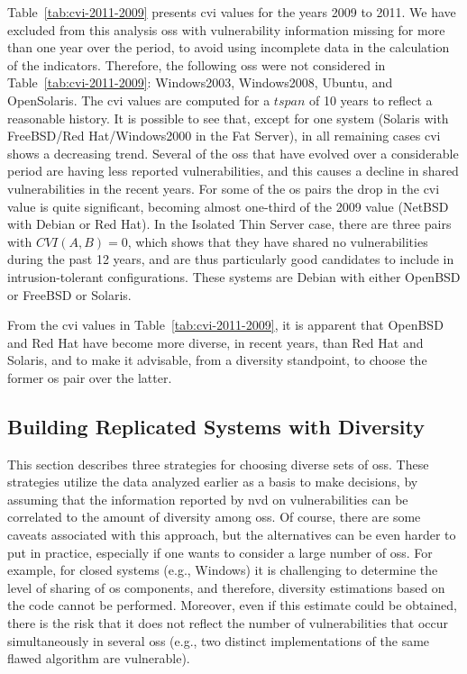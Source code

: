 Table~\ref{tab:cvi-2011-2009} presents \gls{cvi} values for the years 2009 to 2011. 
We have excluded from this analysis \glspl{os} with vulnerability information missing for more than one year over the period, to avoid using incomplete data in the calculation of the indicators. Therefore, the following \glspl{os} were not considered in Table~\ref{tab:cvi-2011-2009}: Windows2003, Windows2008, Ubuntu, and OpenSolaris. 
The \gls{cvi} values are computed for a $\mathit{tspan}$ of 10 years to reflect a reasonable history. 
It is possible to see that, except for one system (Solaris with FreeBSD/Red Hat/Windows2000 in the Fat Server), in all remaining cases \gls{cvi} shows a decreasing trend. 
Several of the \glspl{os} that have evolved over a considerable period are having less reported vulnerabilities, and this causes a decline in shared vulnerabilities in the recent years. 
For some of the \gls{os} pairs the drop in the \gls{cvi} value is quite significant, becoming almost one-third of the 2009 value (NetBSD with Debian or Red Hat). 
In the Isolated Thin Server case, there are three pairs with $\mathit{CVI}(A,B)=0$, which shows that they have shared no vulnerabilities during the past 12 years, and are thus particularly good candidates to include in intrusion-tolerant configurations. 
These systems are Debian with either OpenBSD or FreeBSD or Solaris.

From the \gls{cvi} values in Table~\ref{tab:cvi-2011-2009}, it is apparent that OpenBSD and Red Hat have become more diverse, in recent years, than Red Hat and Solaris, and to make it advisable, from a diversity standpoint, to choose the former \gls{os} pair over the latter.



\subsection{Building Replicated Systems with Diversity}
\label{build_diversity}


This section describes three strategies for choosing diverse sets of \glspl{os}. 
These strategies utilize the data analyzed earlier as a basis to make decisions, by assuming that the information reported by \gls{nvd} on vulnerabilities can be correlated to the amount of diversity among \glspl{os}. 
Of course, there are some caveats associated with this approach, but the alternatives can be even harder to put in practice, especially if one wants to consider a large number of \glspl{os}. 
For example, for closed systems (e.g., Windows) it is challenging to determine the level of sharing of \gls{os} components, and therefore, diversity estimations based on the code cannot be performed. Moreover, even if this estimate could be obtained, there is the risk that it does not reflect the number of vulnerabilities that occur simultaneously in several \glspl{os} (e.g., two distinct implementations of the same flawed algorithm are vulnerable).


